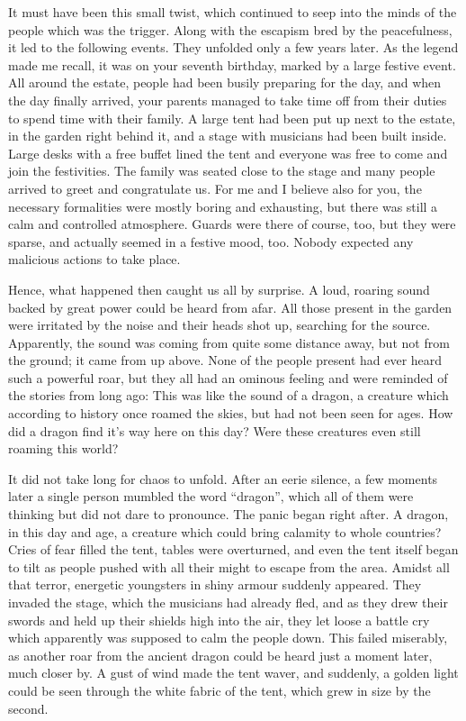 It must have been this small twist, which continued to seep into the minds of the people which was the trigger. Along with the escapism bred by the peacefulness, it led to the following events. They unfolded only a few years later. As the legend made me recall, it was on your seventh birthday, marked by a large festive event. All around the estate, people had been busily preparing for the day, and when the day finally arrived, your parents managed to take time off from their duties to spend time with their family. A large tent had been put up next to the estate, in the garden right behind it, and a stage with musicians had been built inside. Large desks with a free buffet lined the tent and everyone was free to come and join the festivities. The family was seated close to the stage and many people arrived to greet and congratulate us. For me and I believe also for you, the necessary formalities were mostly boring and exhausting, but there was still a calm and controlled atmosphere. Guards were there of course, too, but they were sparse, and actually seemed in a festive mood, too. Nobody expected any malicious actions to take place.

Hence, what happened then caught us all by surprise. A loud, roaring sound backed by great power could be heard from afar. All those present in the garden were irritated by the noise and their heads shot up, searching for the source. Apparently, the sound was coming from quite some distance away, but not from the ground; it came from up above. None of the people present had ever heard such a powerful roar, but they all had an ominous feeling and were reminded of the stories from long ago: This was like the sound of a dragon, a creature which according to history once roamed the skies, but had not been seen for ages. How did a dragon find it's way here on this day? Were these creatures even still roaming this world? 

It did not take long for chaos to unfold. After an eerie silence, a few moments later a single person mumbled the word \enquote{dragon}, which all of them were thinking but did not dare to pronounce. The panic began right after. A dragon, in this day and age, a creature which could bring calamity to whole countries? Cries of fear filled the tent, tables were overturned, and even the tent itself began to tilt as people pushed with all their might to escape from the area. Amidst all that terror, energetic youngsters in shiny armour suddenly appeared. They invaded the stage, which the musicians had already fled, and as they drew their swords and held up their shields high into the air, they let loose a battle cry which apparently was supposed to calm the people down. This failed miserably, as another roar from the ancient dragon could be heard just a moment later, much closer by. A gust of wind made the tent waver, and suddenly, a golden light could be seen through the white fabric of the tent, which grew in size by the second.


